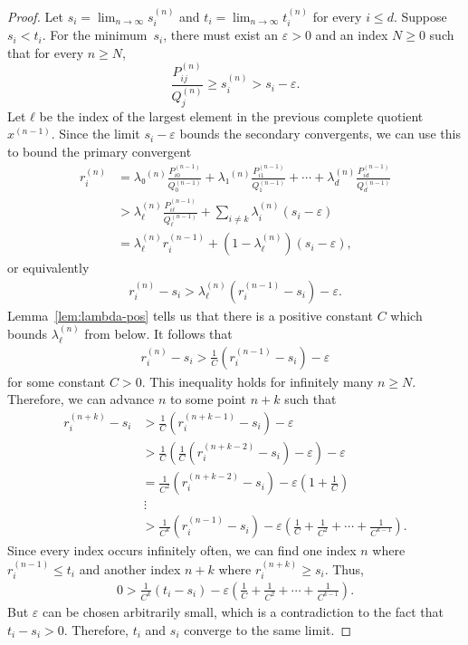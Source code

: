 \begin{proof}
  Let $s_i = \lim_{n → ∞} s_i^{(n)}$
  and $t_i = \lim_{n → ∞} t_i^{(n)}$ for every $i ≤ d$.
  Suppose $s_i < t_i$.
  For the minimum~$s_i$, there must exist an $ε > 0$ and an index $N ≥ 0$ such
  that for every $n ≥ N$,
  \[
    \frac{P_{ij}^{(n)}}{Q_j^{(n)}} ≥ s_i^{(n)} > s_i - ε.
  \]
  Let $ℓ$ be the index of the largest element in the previous complete quotient $x^{(n-1)}$.
  Since the limit $s_i - ε$ bounds the secondary convergents,
  we can use this to bound the primary convergent
  \begin{align*}
    r_i^{(n)}
    & = λ₀^{(n)} \frac{P_{i0}^{(n-1)}}{Q_0^{(n-1)}} + λ₁^{(n)} \frac{P_{i1}^{(n-1)}}{Q_1^{(n-1)}} + ⋯ + λ_d^{(n)} \frac{P_{id}^{(n-1)}}{Q_d^{(n-1)}} \\
    & > λ_{ℓ}^{(n)} \frac{P_{iℓ}^{(n-1)}}{Q_{ℓ}^{(n-1)}} + \sum_{i ≠ k} λ_i^{(n)} (s_i - ε) \\
    & = λ_{ℓ}^{(n)} r_i^{(n-1)} + (1 - λ_ℓ^{(n)}) (s_i - ε),
  \end{align*}
  or equivalently
  \begin{align*}
    r_i^{(n)} - s_i > λ_{ℓ}^{(n)} \left( r_i^{(n-1)} - s_i \right) - ε.
  \end{align*}
  Lemma~\ref{lem:lambda-pos} tells us that there is a positive constant $C$
  which bounds $λ_{ℓ}^{(n)}$ from below.
  It follows that
  \begin{align*}
    r_i^{(n)} - s_i > \frac{1}{C} \left( r_i^{(n-1)} - s_i \right) - ε
  \end{align*}
  for some constant $C > 0$.
  This inequality holds for infinitely many $n ≥ N$.
  Therefore, we can advance $n$ to some point $n + k$
  such that
  \begin{align*}
    r_i^{(n+k)} - s_i
    & > \frac{1}{C} \left( r_i^{(n+k-1)} - s_i \right) - ε \\
    & > \frac{1}{C} \left(\frac{1}{C} \left( r_i^{(n+k-2)} - s_i \right) - ε\right) - ε \\
    & = \frac{1}{C^2} \left(r_i^{(n+k-2)} - s_i \right) - ε\left(1 + \frac{1}{C}\right) \\
    & \, ⋮ \\
    & > \frac{1}{C^k} \left( r_i^{(n-1)} - s_i \right) - ε\left( \frac{1}{C} + \frac{1}{C^2} + ⋯ + \frac{1}{C^{k-1}} \right).
  \end{align*}
  Since every index occurs infinitely often,
  we can find one index $n$ where $r_i^{(n-1)} ≤ t_i$
  and another index $n+k$ where $r_i^{(n+k)} ≥ s_i$.
  Thus,
  \begin{align*}
    0 > \frac{1}{C^k} \left( t_i - s_i \right) - ε\left( \frac{1}{C} + \frac{1}{C^2} + ⋯ + \frac{1}{C^{k-1}} \right).
  \end{align*}
  But $ε$ can be chosen arbitrarily small,
  which is a contradiction to the fact that $t_i - s_i > 0$.
  Therefore, $t_i$ and $s_i$ converge to the same limit.
\end{proof}

